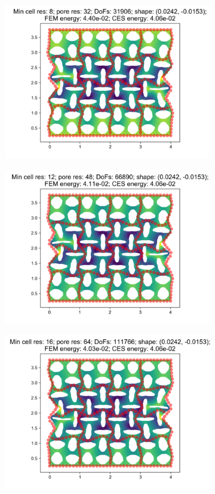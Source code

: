 \begin{figure}[H]
\begin{subfigure}{.45\textwidth}
\end{subfigure}
\begin{subfigure}{.45\textwidth}
  \centering
  \includegraphics[width=.8\linewidth]{lces/vis_compression/bm_2_mesh_3.png}
\end{subfigure}
\newline
\begin{subfigure}{.45\textwidth}
  \centering
  \includegraphics[width=.8\linewidth]{lces/vis_compression/bm_2_mesh_4.png}
\end{subfigure}
\begin{subfigure}{.45\textwidth}
  \centering
  \includegraphics[width=.8\linewidth]{lces/vis_compression/bm_2_mesh_5.png}
\end{subfigure}
\end{figure}

